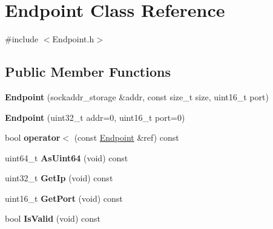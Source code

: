 \hypertarget{class_endpoint}{\section{Endpoint Class Reference}
\label{class_endpoint}
}


{\ttfamily \#include $<$Endpoint.\-h$>$}

\subsection*{Public Member Functions}
\begin{DoxyCompactItemize}
\item 
\hypertarget{class_endpoint_a155f5e34aad88e781207ffa55666992f}{{\bfseries Endpoint} (sockaddr\-\_\-storage \&addr, const size\-\_\-t size, uint16\-\_\-t port)}\label{class_endpoint_a155f5e34aad88e781207ffa55666992f}

\item 
\hypertarget{class_endpoint_aea663fa6d602bd9b0ee36a0a20c10515}{{\bfseries Endpoint} (uint32\-\_\-t addr=0, uint16\-\_\-t port=0)}\label{class_endpoint_aea663fa6d602bd9b0ee36a0a20c10515}

\item 
\hypertarget{class_endpoint_a1ebaa89afaae9dd7b1305532634c2871}{bool {\bfseries operator$<$} (const \hyperlink{class_endpoint}{Endpoint} \&ref) const }\label{class_endpoint_a1ebaa89afaae9dd7b1305532634c2871}

\item 
\hypertarget{class_endpoint_a2d0912e7fa4ae54f9402d6833a6d3ae6}{uint64\-\_\-t {\bfseries As\-Uint64} (void) const }\label{class_endpoint_a2d0912e7fa4ae54f9402d6833a6d3ae6}

\item 
\hypertarget{class_endpoint_a5618578a2aea0258faac2ec166809f61}{uint32\-\_\-t {\bfseries Get\-Ip} (void) const }\label{class_endpoint_a5618578a2aea0258faac2ec166809f61}

\item 
\hypertarget{class_endpoint_ab314920c2ea906136bb10db9a8b19d9f}{uint16\-\_\-t {\bfseries Get\-Port} (void) const }\label{class_endpoint_ab314920c2ea906136bb10db9a8b19d9f}

\item 
\hypertarget{class_endpoint_a514014f7d1ee63a7c5a3ed7c8b129526}{bool {\bfseries Is\-Valid} (void) const }\label{class_endpoint_a514014f7d1ee63a7c5a3ed7c8b129526}

\end{DoxyCompactItemize}
